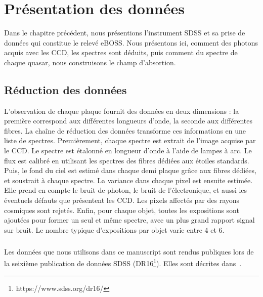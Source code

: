 \documentclass[11pt, twoside, a4paper, openright]{report}
\begin{document}

\graphicspath{ {../figures/donnees/} }

\chapter{Présentation des données}
\minitoc
\newpage
\thispagestyle{fancy}

Dans le chapitre précédent, nous présentions l'instrument SDSS et sa prise de données qui constitue le relevé eBOSS. Nous présentons ici, comment des photons acquis avec les CCD, les spectres sont déduits, puis comment du spectre de chaque quasar, nous construisons le champ d'absortion.

\section{Réduction des données}
L'observation de chaque plaque fournit des données en deux dimensions : la première correspond aux différentes longueurs d'onde, la seconde aux différentes fibres. La chaîne de réduction des données transforme ces informations en une liste de spectres.
Premièrement, chaque spectre est extrait de l'image acquise par le CCD. Le spectre est étalonné en longueur d'onde à l'aide de lampes à arc. Le flux est calibré en utilisant les spectres des fibres dédiées aux étoiles standards. Puis, le fond du ciel est estimé dans chaque demi plaque grâce aux fibres dédiées, et soustrait à chaque spectre.
La variance dans chaque pixel est ensuite estimée. Elle prend en compte le bruit de photon, le bruit de l'électronique, et aussi les éventuels défauts que présentent les CCD. Les pixels affectés par des rayons cosmiques sont rejetés.
Enfin, pour chaque objet, toutes les expositions sont ajoutées pour former un seul et même spectre, avec un plus grand rapport signal sur bruit. Le nombre typique d'expositions par objet varie entre 4 et 6.

\paragraph{}
Les données que nous utilisons dans ce manuscript sont rendus publiques lors de la seixième publication de données SDSS (DR16\footnote{https://www.sdss.org/dr16/}). Elles sont décrites dans~\cite{Ahumada2019}.
\end{document}

